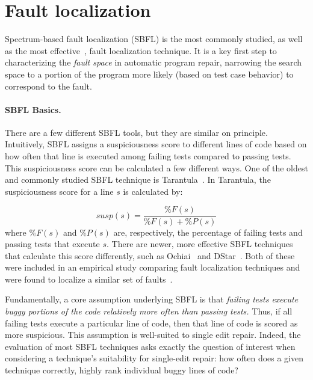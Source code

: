 \section{Fault localization}



Spectrum-based fault localization (SBFL) is the most commonly studied, as well as the most 
effective~\cite{zou2019empirical}, fault localization technique. It is a key
first step to characterizing the \emph{fault space} in automatic program repair,
narrowing the search space to a portion of the program more likely (based on
test case behavior) to correspond to the fault.  

\paragraph{SBFL Basics.} 
There are a few different SBFL tools, but they are 
similar on principle. Intuitively, SBFL assigns a suspiciousness score to different lines of 
code based on how often that line is executed among failing tests compared to passing 
tests. This suspiciousness score can be calculated a few different ways. One of the oldest 
and commonly studied SBFL technique is Tarantula~\cite{tarantula}. In Tarantula, the 
suspiciousness score for a line $s$ is calculated by:

$$\mathit{susp(s)} 
=\frac{\mathit{\%F(s)}}{\mathit{\%F(s)} + \mathit{\%P(s)}}$$
where  $\mathit{\%F(s)}$ and $\mathit{\%P(s)}$ are, respectively, the percentage of failing 
tests and passing tests that execute $s$. There are newer, more effective 
SBFL techniques that calculate this score differently, such as Ochiai~\cite{ochiai} and 
DStar~\cite{wong2013dstar}. Both of these were included in an empirical study 
comparing fault localization techniques and were found to localize a similar set of 
faults~\cite{zou2019empirical}.
  

Fundamentally, a core assumption underlying SBFL is that \emph{failing tests execute 
buggy portions of the code relatively more often than passing tests.} 
Thus, if all failing tests execute a 
particular line of code, then that line of code is scored as more suspicious.
This assumption is well-suited to single edit repair. Indeed, the evaluation
of most SBFL techniques asks exactly the question of interest when considering a
technique's suitability for single-edit repair: how often does a given technique
correctly, highly rank individual buggy lines of code? 

